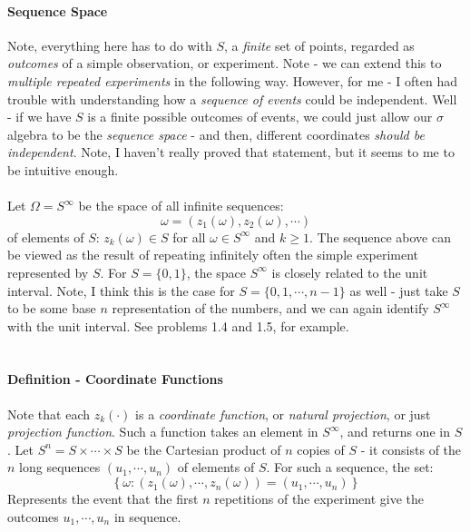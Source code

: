 \documentclass[12pt,a4paper]{article}
\newcommand{\1}[1]{\mathbbm{1}\left\{ #1 \right\}}
\begin{document}
\paragraph{Sequence Space}
Note, everything here has to do with $S$, a \textit{finite} set of points, regarded as \textit{outcomes} of a simple observation, or experiment. Note - we can extend this to \textit{multiple repeated experiments} in the following way. However, for me - I often had trouble with understanding how a \textit{sequence of events} could be independent. Well - if we have $S$ is a finite possible outcomes of events, we could just allow our $\sigma$ algebra to be the \textit{sequence space} - and then, different coordinates \textit{should be independent}. Note, I haven't really proved that statement, but it seems to me to be intuitive enough.
\\\\
Let $\Omega = S^\infty$ be the space of all infinite sequences:
$$
	\omega = (z_1(\omega), z_2(\omega), \cdots)
$$ 
of elements of $S$: $z_k(\omega) \in S$ for all $\omega \in S^\infty$ and $k \geq 1$. The sequence above can be viewed as the result of repeating infinitely often the simple experiment represented by $S$. For $S = \{0,1\}$, the space $S^\infty$ is closely related to the unit interval. Note, I think this is the case for $S = \{0,1, \cdots, n-1\}$ as well - just take $S$ to be some base $n$ representation of the numbers, and we can again identify $S^\infty$ with the unit interval. See problems 1.4 and 1.5, for example.
\\\\
\paragraph{Definition - Coordinate Functions} Note that each $z_k(\cdot)$ is a \textit{coordinate function}, or \textit{natural projection}, or just \textit{projection function}. Such a function takes an element in $S^\infty$, and returns one in $S$. Let $S^n = S \times \cdots \times S$ be the Cartesian product of $n$ copies of $S$ - it consists of the $n$ long sequences $(u_1, \cdots, u_n)$ of elements of $S$. For such a sequence, the set:
$$
	\left\{\omega : (z_1(\omega), \cdots, z_n(\omega)) = (u_1, \cdots, u_n)\right\}
$$
Represents the event that the first $n$ repetitions of the experiment give the outcomes $u_1, \cdots, u_n$ in sequence.
\end{document}
